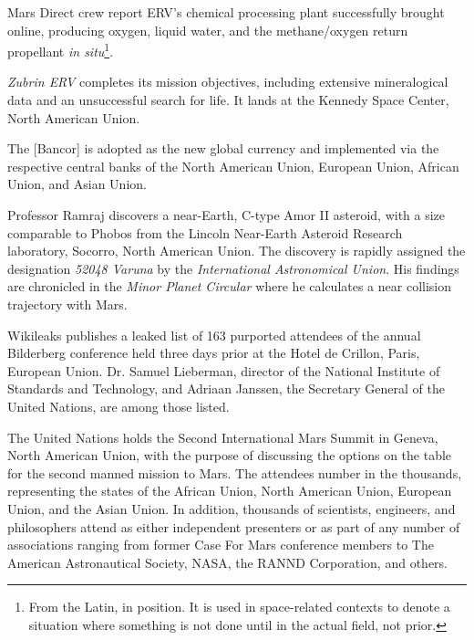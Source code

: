 Mars Direct crew report ERV's chemical processing plant successfully brought online, producing oxygen, liquid water, and the methane/oxygen return propellant {\it in situ}\footnote{From the Latin, in position. It is used in space-related contexts to denote a situation where something is not done until in the actual field, not prior.}.
\StopTimelineDate

{\it Zubrin ERV} completes its mission objectives, including extensive mineralogical data and an unsuccessful search for life. It lands at the Kennedy Space Center, North American Union.
\StopTimelineDate

The [Bancor] is adopted as the new global currency and implemented via the respective central banks of the North American Union, European Union, African Union, and Asian Union.
\StopTimelineDate

Professor Ramraj discovers a near-Earth, C-type Amor II asteroid, with a size comparable to Phobos from the Lincoln Near-Earth Asteroid Research laboratory, Socorro, North American Union. The discovery is rapidly assigned the designation {\it 52048 Varuna} by the {\it International Astronomical Union}. His findings are chronicled in the {\it Minor Planet Circular} where he calculates a near collision trajectory with Mars.
\StopTimelineDate

Wikileaks publishes a leaked list of 163 purported attendees of the annual Bilderberg conference held three days prior at the Hotel de Crillon, Paris, European Union. Dr. Samuel Lieberman, director of the National Institute of Standards and Technology, and Adriaan Janssen, the Secretary General of the United Nations, are among those listed.
\StopTimelineDate

The United Nations holds the Second International Mars Summit in Geneva, North American Union, with the purpose of discussing the options on the table for the second manned mission to Mars. The attendees number in the thousands, representing the states of the African Union, North American Union, European Union, and the Asian Union. In addition, thousands of scientists, engineers, and philosophers attend as either independent presenters or as part of any number of associations ranging from former Case For Mars conference members to The American Astronautical Society, NASA, the RANND Corporation, and others.

